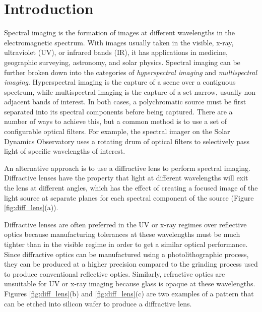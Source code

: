 \documentclass{article}
\begin{document}
\section{Introduction}
\label{sec:intro}
Spectral imaging is the formation of images at different wavelengths in the
electromagnetic spectrum.  With images usually taken in the visible, x-ray,
ultraviolet (UV), or infrared bands (IR), it has applications in medicine, geographic
surveying, astronomy, and solar physics.  Spectral imaging can be further broken
down into the categories of \emph{hyperspectral imaging} and \emph{multispectral imaging}.
Hyperspectral imaging is the capture of a scene over a contiguous spectrum,
while multispectral imaging is the capture of a set narrow, usually non-adjacent
bands of interest.  In both cases, a polychromatic source must be first
separated into its spectral components before being captured.  There are a
number of ways to achieve this, but a common method is to use a set of
configurable optical filters.  For example, the spectral imager on the Solar
Dynamics Observatory uses a rotating drum of optical filters to selectively pass
light of specific wavelengths of interest.


An alternative approach is to use a diffractive lens to perform spectral
imaging.  Diffractive lenses have the property that light at different
wavelengths will exit the lens at different angles, which has the effect of
creating a focused image of the light source at separate planes for each
spectral component of the source (Figure \ref{fig:diff_lens}(a)).

Diffractive lenses are often preferred in the UV or x-ray regimes over
reflective optics because manufacturing tolerances at these wavelengths must be
much tighter than in the visible regime in order to get a similar optical
performance.  Since diffractive optics can be manufactured using a
photolithographic process, they can be produced at a higher precision compared
to the grinding process used to produce conventional reflective optics.
Similarly, refractive optics are unsuitable for UV or x-ray imaging because
glass is opaque at these wavelengths. Figures \ref{fig:diff_lens}(b) and
\ref{fig:diff_lens}(c) are two examples of a pattern that can be etched into
silicon wafer to produce a diffractive lens.
\end{document}
